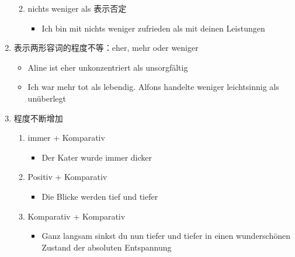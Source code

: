 \documentclass[UTF8]{report}
\begin{document}
\begin{enumerate}
\begin{enumerate}
\begin{itemize}
        \end{itemize}
        \item nichts weniger als 表示否定
        \begin{itemize}
            \item Ich bin mit nichts weniger zufrieden als mit deinen Leistungen
        \end{itemize}
    \end{enumerate}
    \item 表示两形容词的程度不等：eher, mehr oder weniger
    \begin{itemize}
        \item Aline ist eher unkonzentriert als unsorgfältig
        \item Ich war mehr tot als lebendig. Alfons handelte weniger leichtsinnig als unüberlegt
    \end{itemize}
    \item 程度不断增加
    \begin{enumerate}
        \item immer + Komparativ
        \begin{itemize}
            \item Der Kater wurde immer dicker
        \end{itemize}
        \item Positiv + Komparativ
        \begin{itemize}
            \item Die Blicke werden tief und tiefer
        \end{itemize}
        \item Komparativ + Komparativ
        \begin{itemize}
            \item Ganz langsam sinkst du nun tiefer und tiefer in einen wunderschönen Zustand der absoluten Entspannung
        \end{itemize}
    \end{enumerate}
\end{enumerate}
\end{document}
